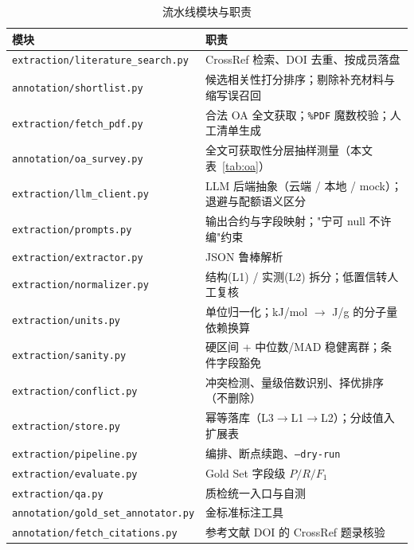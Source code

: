 \documentclass[11pt,a4paper]{ctexart}
\begin{document}
\begin{table}[htbp]
\centering
\caption{流水线模块与职责}
\begin{tabularx}{\textwidth}{l X}
\toprule
模块 & 职责\\
\midrule
\texttt{extraction/literature\_search.py} & CrossRef 检索、DOI 去重、按成员落盘\\
\texttt{annotation/shortlist.py} & 候选相关性打分排序；剔除补充材料与缩写误召回\\
\texttt{extraction/fetch\_pdf.py} & 合法 OA 全文获取；\texttt{\%PDF} 魔数校验；人工清单生成\\
\texttt{annotation/oa\_survey.py} & 全文可获取性分层抽样测量（本文表~\ref{tab:oa}）\\
\texttt{extraction/llm\_client.py} & LLM 后端抽象（云端 / 本地 / mock）；退避与配额语义区分\\
\texttt{extraction/prompts.py} & 输出合约与字段映射；"宁可 null 不许编"约束\\
\texttt{extraction/extractor.py} & JSON 鲁棒解析\\
\texttt{extraction/normalizer.py} & 结构(L1) / 实测(L2) 拆分；低置信转人工复核\\
\texttt{extraction/units.py} & 单位归一化；kJ/mol $\to$ J/g 的分子量依赖换算\\
\texttt{extraction/sanity.py} & 硬区间 + 中位数/MAD 稳健离群；条件字段豁免\\
\texttt{extraction/conflict.py} & 冲突检测、量级倍数识别、择优排序（不删除）\\
\texttt{extraction/store.py} & 幂等落库（L3$\to$L1$\to$L2）；分歧值入扩展表\\
\texttt{extraction/pipeline.py} & 编排、断点续跑、\texttt{--dry-run}\\
\texttt{extraction/evaluate.py} & Gold Set 字段级 $P/R/F_1$\\
\texttt{extraction/qa.py} & 质检统一入口与自测\\
\texttt{annotation/gold\_set\_annotator.py} & 金标准标注工具\\
\texttt{annotation/fetch\_citations.py} & 参考文献 DOI 的 CrossRef 题录核验\\
\bottomrule
\end{tabularx}
\end{table}
\end{document}
